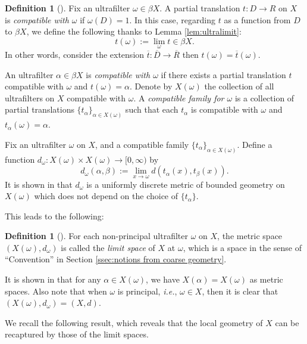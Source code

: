 \documentclass[12pt, a4paper]{amsart}
\numberwithin{equation}{section}
\theoremstyle{definition}
\newtheorem{defn}[thm]{Definition}
\theoremstyle{remark}
\begin{document}
\begin{defn}[{\cite[Definition 3.2 and 3.6]{SW17}}]\label{defn:limit space compatible}
Fix an ultrafilter $\omega \in \beta X$. A partial translation $t:D \to R$ on $X$ is \emph{compatible with $\omega$} if $\omega(D)=1$. In this case, regarding $t$ as a function from $D$ to $\beta X$, we define the following thanks to Lemma \ref{lem:ultralimit}:
\[
t(\omega):=\lim_\omega t \in \beta X.
\]
In other words, consider the extension $\overline{t}: \overline{D} \to \overline{R}$ then $t(\omega) = \overline{t}(\omega)$.

An ultrafilter $\alpha \in \beta X$ is \emph{compatible with $\omega$} if there exists a partial translation $t$ compatible with $\omega$ and $t(\omega)=\alpha$. Denote by $X(\omega)$ the collection of all ultrafilters on $X$ compatible with $\omega$. A \emph{compatible family for $\omega$} is a collection of partial translations $\{t_\alpha\}_{\alpha \in X(\omega)}$ such that each $t_\alpha$ is compatible with $\omega$ and $t_\alpha(\omega)=\alpha$.
\end{defn}

Fix an ultrafilter $\omega$ on $X$, and a compatible family $\{t_\alpha\}_{\alpha \in X(\omega)}$. Define a function $d_{\omega}: X(\omega) \times X(\omega) \to [0,\infty)$ by
$$d_{\omega}(\alpha, \beta):=\lim_{x\to \omega}d(t_\alpha(x),t_\beta(x)).$$
It is shown in \cite[Proposition 3.7]{SW17} that $d_\omega$ is a uniformly discrete metric of bounded geometry on $X(\omega)$ which does not depend on the choice of $\{t_{\alpha}\}$.

This leads to the following:

\begin{defn}[{\cite[Definition 3.8]{SW17}}]\label{defn:limit space}
For each non-principal ultrafilter $\omega$ on $X$, the metric space $(X(\omega), d_\omega)$ is called the \emph{limit space} of $X$ at $\omega$, which is a space in the sense of ``Convention'' in Section \ref{ssec:notions from coarse geometry}.
\end{defn}

It is shown in \cite[Proposition 3.9]{SW17} that for any $\alpha \in X(\omega)$, we have $X(\alpha) = X(\omega)$ as metric spaces. Also note that when $\omega$ is principal, \emph{i.e.}, $\omega \in X$, then it is clear that $(X(\omega), d_\omega) = (X,d)$. 

We recall the following result, which reveals that the local geometry of $X$ can be recaptured by those of the limit spaces.
\end{document}
